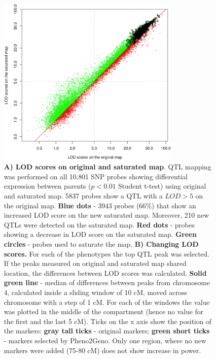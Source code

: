 \begin{figure}[h!]
  \centering
  \includegraphics[keepaspectratio,width=0.8\textwidth]{eps/image_2_3.eps}
  \caption[LOD changes.]{
          {\bf A) LOD scores on original and saturated map}. QTL mapping was performed on all 10,801 SNP probes showing differential 
          expression between parents ($p < 0.01$ Student t-test) using original and saturated map. 5837 probes show   a QTL with a 
          $LOD > 5$ on  the original map. {\bf Blue dots} - 3943 probes (66\%) that show an increased LOD score on the new saturated map. 
          Moreover, 210 new QTLs were detected on the saturated map. 
            {\bf Red dots} -  probes showing a decrease in LOD score on the saturated map. 
            {\bf Green circles} - probes used to saturate the map.
          {\bf B) Changing LOD scores.} For each of the phenotypes the top QTL  peak was selected. If the peaks measured on original 
          and saturated map shared location, the differences between LOD scores was calculated. {\bf Solid green line} - median of 
          differences between peaks from chromosome 4, calculated inside a sliding window of 10 cM, moved across chromosome with a 
          step of 1 cM. For each of the windows the value was plotted in the middle of the compartment (hence no value for the first 
          and the last 5 cM). Ticks on the x axis show the position of the markers: {\bf gray tall ticks} - original markers; 
          {\bf green short ticks} - markers selected by Pheno2Geno. Only one region, where no new markers were added (75-80 cM) does not show increase in power. }
  		  \label{fig:qtldetection}
\end{figure}

